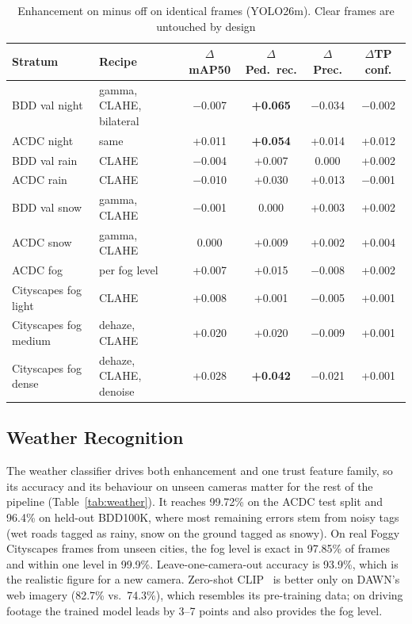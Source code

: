 \documentclass[pdflatex,sn-mathphys-num]{sn-jnl}
\begin{document}
\begin{table}[t]
\caption{Enhancement on minus off on identical frames (YOLO26m). Clear frames are untouched by design}
\label{tab:enh}
\footnotesize
\setlength{\tabcolsep}{4pt}
\begin{tabular}{@{}llcccc@{}}
\toprule
Stratum & Recipe & $\Delta$mAP50 & $\Delta$Ped.\ rec. & $\Delta$Prec. & $\Delta$TP conf. \\
\midrule
BDD val night & gamma, CLAHE, bilateral & $-$0.007 & \textbf{+0.065} & $-$0.034 & $-$0.002 \\
ACDC night & same & +0.011 & \textbf{+0.054} & +0.014 & +0.012 \\
BDD val rain & CLAHE & $-$0.004 & +0.007 & 0.000 & +0.002 \\
ACDC rain & CLAHE & $-$0.010 & +0.030 & +0.013 & $-$0.001 \\
BDD val snow & gamma, CLAHE & $-$0.001 & 0.000 & +0.003 & +0.002 \\
ACDC snow & gamma, CLAHE & 0.000 & +0.009 & +0.002 & +0.004 \\
ACDC fog & per fog level & +0.007 & +0.015 & $-$0.008 & +0.002 \\
Cityscapes fog light & CLAHE & +0.008 & +0.001 & $-$0.005 & +0.001 \\
Cityscapes fog medium & dehaze, CLAHE & +0.020 & +0.020 & $-$0.009 & +0.001 \\
Cityscapes fog dense & dehaze, CLAHE, denoise & +0.028 & \textbf{+0.042} & $-$0.021 & +0.001 \\
\bottomrule
\end{tabular}
\end{table}

\subsection{Weather Recognition}

The weather classifier drives both enhancement and one trust feature family, so its accuracy and its behaviour on unseen cameras matter for the rest of the pipeline (Table~\ref{tab:weather}). It reaches 99.72\% on the ACDC test split and 96.4\% on held-out BDD100K, where most remaining errors stem from noisy tags (wet roads tagged as rainy, snow on the ground tagged as snowy). On real Foggy Cityscapes frames from unseen cities, the fog level is exact in 97.85\% of frames and within one level in 99.9\%. Leave-one-camera-out accuracy is 93.9\%, which is the realistic figure for a new camera. Zero-shot CLIP~\cite{radford2021clip} is better only on DAWN's web imagery (82.7\% vs.\ 74.3\%), which resembles its pre-training data; on driving footage the trained model leads by 3--7 points and also provides the fog level.
\end{document}
